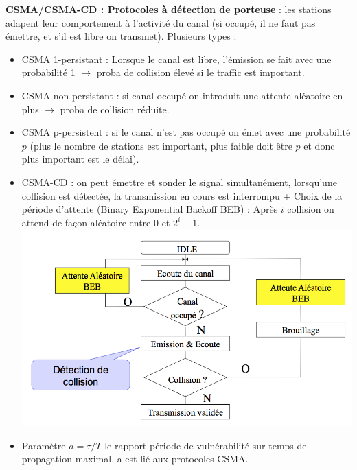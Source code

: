 \documentclass[a4paper,9pt, twocolumn]{article}
\begin{document}
	\textbf{CSMA/CSMA-CD : Protocoles à détection de porteuse} : les stations adapent leur comportement à l'activité du canal (si occupé, il ne faut pas émettre, et s'il est libre on transmet). Plusieurs types :
	\begin{itemize}
		\item CSMA 1-persistant : Lorsque le canal est libre, l'émission se fait avec une probabilité 1 $\longrightarrow$ proba de collision élevé si le traffic est important.
		\item CSMA non persistant : si canal occupé on introduit une attente aléatoire en plus $\longrightarrow$ proba de collision réduite.
		\item CSMA p-persistent : si le canal n'est pas occupé on émet avec une probabilité $p$ (plus le nombre de stations est important, plus faible doit être $p$ et donc plus important est le délai).
		\item CSMA-CD : on peut émettre et sonder le signal simultanément, lorsqu'une collision est détectée, la transmission en cours est interrompu + Choix de la période d'attente (Binary Exponential Backoff BEB) : Après $i$ collision on attend de façon aléatoire entre $0$ et $2^{i}-1$.
			\includegraphics[scale=0.4]{CD.png}
		\item Paramètre $a = \tau /T$ le rapport période de vulnérabilité sur temps de propagation maximal. a est lié aux protocoles CSMA.
	\end{itemize}
\end{document}
